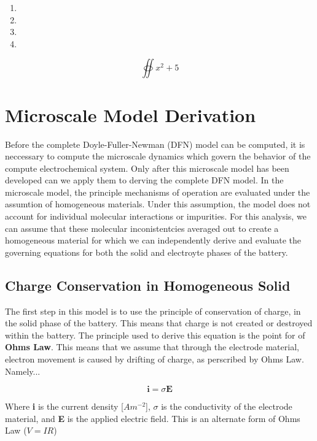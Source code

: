 \documentclass[lettersize,journal]{IEEEtran}
\begin{document}
\begin{enumerate}
  \item
  \item
  \item
  \item

\end{enumerate}

\[
  \oiint x^2 +5
\]




\section{Microscale Model Derivation}

Before the complete Doyle-Fuller-Newman (DFN) model can be computed, it is neccessary to compute the microscale dynamics which govern the behavior of the compute electrochemical system. Only after this microscale model has been developed can we apply them to derving the complete DFN model. In the microscale model, the principle mechanisms of operation are evaluated under the assumtion of homogeneous materials. Under this assumption, the model does not account for individual molecular interactions or impurities. For this analysis, we can assume that these molecular inconistentcies averaged out to create a homogeneous material for which we can independently derive and evaluate the governing equations for both the solid and electroyte phases of the battery.



\subsection{Charge Conservation in Homogeneous Solid}

The first step in this model is to use the principle of conservation of charge, in the solid phase of the battery. This means that charge is not created or destroyed within the battery. The principle used to derive this equation is the point for of \textbf{Ohms Law}. This means that we assume that through the electrode material, electron movement is caused by drifting of charge, as perscribed by Ohms Law. Namely...

\[
\textbf{i} = \sigma\textbf{E}
\]

Where \textbf{i} is the current density [$Am^{-2}$], $\sigma$ is the conductivity of the electrode material, and \textbf{E} is the applied electric field. This is an alternate form of Ohms Law ($V = IR$)
\end{document}
